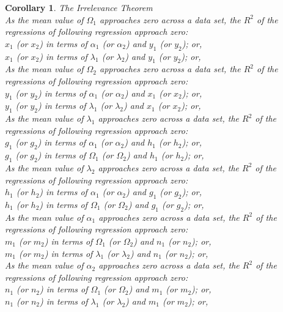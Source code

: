 \documentclass[preprint,13pt]{elsarticle}
\newtheorem{corollary}{Corollary}[theorem]
\begin{document}
\begin{corollary} The Irrelevance Theorem\\
As the mean value of $\Omega_{1}$ approaches zero across a data set, the $R^2$ of the regressions of following regression approach zero:\\
$x_{1}$ (or $x_{2}$) in terms of $\alpha_{1}$ (or $\alpha_{2}$) and $y_{1}$ (or $y_{2}$); or,\\
$x_{1}$ (or $x_{2}$) in terms of $\lambda_{1}$ (or $\lambda_{2}$) and $y_{1}$ (or $y_{2}$); or,\\

As the mean value of $\Omega_{2}$ approaches zero across a data set, the $R^2$ of the regressions of following regression approach zero:\\
$y_{1}$ (or $y_{2}$) in terms of $\alpha_{1}$ (or $\alpha_{2}$) and $x_{1}$ (or $x_{2}$); or,\\
$y_{1}$ (or $y_{2}$) in terms of $\lambda_{1}$ (or $\lambda_{2}$) and $x_{1}$ (or $x_{2}$); or,\\

As the mean value of $\lambda_{1}$ approaches zero across a data set, the $R^2$ of the regressions of following regression approach zero:\\
$g_{1}$ (or $g_{2}$) in terms of $\alpha_{1}$ (or $\alpha_{2}$) and $h_{1}$ (or $h_{2}$); or,\\
$g_{1}$ (or $g_{2}$) in terms of $\Omega_{1}$ (or $\Omega_{2}$) and $h_{1}$ (or $h_{2}$); or,\\

As the mean value of $\lambda_{2}$ approaches zero across a data set, the $R^2$ of the regressions of following regression approach zero:\\
$h_{1}$ (or $h_{2}$) in terms of $\alpha_{1}$ (or $\alpha_{2}$) and $g_{1}$ (or $g_{2}$); or,\\
$h_{1}$ (or $h_{2}$) in terms of $\Omega_{1}$ (or $\Omega_{2}$) and $g_{1}$ (or $g_{2}$); or,\\

As the mean value of $\alpha_{1}$ approaches zero across a data set, the $R^2$ of the regressions of following regression approach zero:\\
$m_{1}$ (or $m_{2}$) in terms of $\Omega_{1}$ (or $\Omega_{2}$) and $n_{1}$ (or $n_{2}$); or,\\
$m_{1}$ (or $m_{2}$) in terms of $\lambda_{1}$ (or $\lambda_{2}$) and $n_{1}$ (or $n_{2}$); or,\\

As the mean value of $\alpha_{2}$ approaches zero across a data set, the $R^2$ of the regressions of following regression approach zero:\\
$n_{1}$ (or $n_{2}$) in terms of $\Omega_{1}$ (or $\Omega_{2}$) and $m_{1}$ (or $m_{2}$); or,\\
$n_{1}$ (or $n_{2}$) in terms of $\lambda_{1}$ (or $\lambda_{2}$) and $m_{1}$ (or $m_{2}$); or,\\
\end{corollary}
\end{document}

